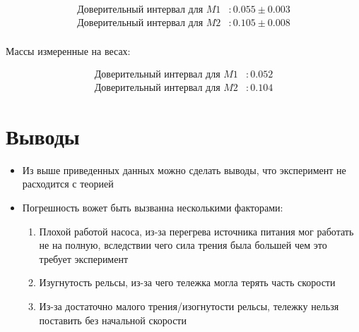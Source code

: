 \documentclass[a4paper]{article}
\begin{document}
\begin{center}
\begin{align*}
\text{Доверительный интервал для } M1 &: 0.055 \pm 0.003 \\
\text{Доверительный интервал для } M2 &: 0.105 \pm 0.008 \\
\end{align*}
\end{center}
Массы измеренные на весах:
\begin{center}
\begin{align*}
\text{Доверительный интервал для } M1 &: 0.052\\
\text{Доверительный интервал для } M2 &: 0.104
\end{align*}
\end{center}


\section{Выводы}

\begin{itemize}
	\item Из выше приведенных данных можно сделать выводы, что эксперимент не расходится с теорией
	\item Погрешность вожет быть вызванна несколькими факторами:
	\begin{enumerate}
		\item Плохой работой насоса, из-за перегрева источника питания мог работать не на полную, вследствии чего сила трения была большей чем это требует эксперимент
		\item Изугнутость рельсы, из-за чего тележка могла терять часть скорости
		\item Из-за достаточно малого трения/изогнутости рельсы, тележку нельзя поставить без начальной скорости
	\end{enumerate}
\end{itemize}
\end{document}
